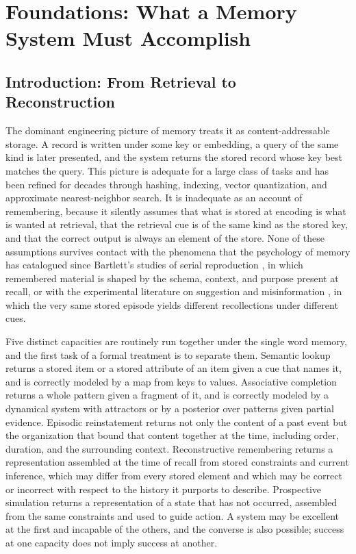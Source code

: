 \part{Foundations: What a Memory System Must Accomplish}

\chapter{Introduction: From Retrieval to Reconstruction}\label{ch:intro}

The dominant engineering picture of memory treats it as content-addressable storage. A record is written under some key or embedding, a query of the same kind is later presented, and the system returns the stored record whose key best matches the query. This picture is adequate for a large class of tasks and has been refined for decades through hashing, indexing, vector quantization, and approximate nearest-neighbor search. It is inadequate as an account of remembering, because it silently assumes that what is stored at encoding is what is wanted at retrieval, that the retrieval cue is of the same kind as the stored key, and that the correct output is always an element of the store. None of these assumptions survives contact with the phenomena that the psychology of memory has catalogued since Bartlett's studies of serial reproduction \cite{bartlett1932}, in which remembered material is shaped by the schema, context, and purpose present at recall, or with the experimental literature on suggestion and misinformation \cite{loftus1974}, in which the very same stored episode yields different recollections under different cues.

Five distinct capacities are routinely run together under the single word memory, and the first task of a formal treatment is to separate them. Semantic lookup returns a stored item or a stored attribute of an item given a cue that names it, and is correctly modeled by a map from keys to values. Associative completion returns a whole pattern given a fragment of it, and is correctly modeled by a dynamical system with attractors or by a posterior over patterns given partial evidence. Episodic reinstatement returns not only the content of a past event but the organization that bound that content together at the time, including order, duration, and the surrounding context. Reconstructive remembering returns a representation assembled at the time of recall from stored constraints and current inference, which may differ from every stored element and which may be correct or incorrect with respect to the history it purports to describe. Prospective simulation returns a representation of a state that has not occurred, assembled from the same constraints and used to guide action. A system may be excellent at the first and incapable of the others, and the converse is also possible; success at one capacity does not imply success at another.

